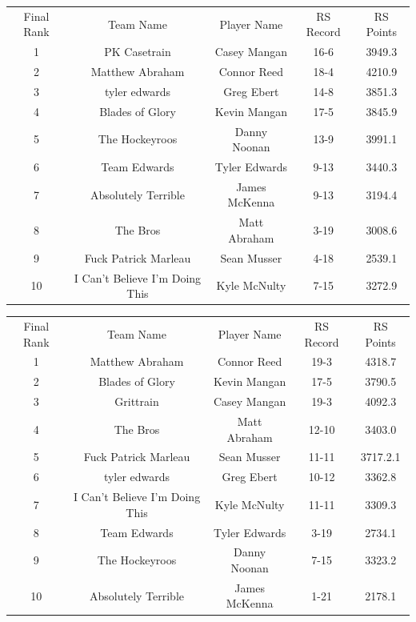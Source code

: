 \documentclass[11pt,letterpaper]{article}
\begin{document}
\vspace{-25pt}
\begin{table} [h]
\begin{center}
\begin{tabular} { c c c c c }
\\ Final Rank & Team Name & Player Name & RS Record & RS Points
\\ 1 & PK Casetrain & Casey Mangan & 16-6 & 3949.3
\\ 2 & Matthew Abraham & Connor Reed & 18-4 & 4210.9
\\ 3 & tyler edwards & Greg Ebert & 14-8 & 3851.3
\\ 4 & Blades of Glory & Kevin Mangan & 17-5 & 3845.9
\\ 5 & The Hockeyroos & Danny Noonan & 13-9 & 3991.1
\\ 6 & Team Edwards & Tyler Edwards & 9-13 & 3440.3
\\ 7 & Absolutely Terrible & James McKenna & 9-13 & 3194.4
\\ 8 & The Bros & Matt Abraham & 3-19 & 3008.6
\\ 9 & Fuck Patrick Marleau & Sean Musser & 4-18 & 2539.1
\\ 10 & I Can't Believe I'm Doing This & Kyle McNulty & 7-15 & 3272.9
\end{tabular}
\end{center}
\end{table}

\newpage
{}
\vspace{-25pt}
\begin{table} [h]
\begin{center}
\begin{tabular} { c c c c c }
\\ Final Rank & Team Name & Player Name & RS Record & RS Points
\\ 1 & Matthew Abraham & Connor Reed & 19-3 & 4318.7
\\ 2 & Blades of Glory & Kevin Mangan & 17-5 & 3790.5
\\ 3 & Grittrain & Casey Mangan & 19-3 & 4092.3
\\ 4 & The Bros & Matt Abraham & 12-10 & 3403.0
\\ 5 & Fuck Patrick Marleau & Sean Musser & 11-11 & 3717.2.1
\\ 6 & tyler edwards & Greg Ebert & 10-12 & 3362.8
\\ 7 & I Can't Believe I'm Doing This & Kyle McNulty & 11-11 & 3309.3
\\ 8 & Team Edwards & Tyler Edwards & 3-19 & 2734.1
\\ 9 & The Hockeyroos & Danny Noonan & 7-15 & 3323.2
\\ 10 & Absolutely Terrible & James McKenna & 1-21 & 2178.1
\end{tabular}
\end{center}
\end{table}
\end{document}
